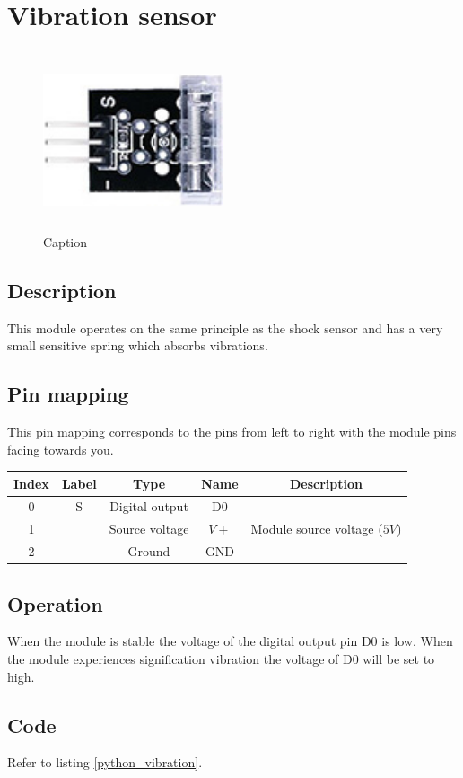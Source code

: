 \section{Vibration sensor}
\begin{figure}[H]
    \centering
    \includegraphics[angle=0, keepaspectratio=true, scale=1, width=200px, height=200px]{images/vibration.jpg}
    \caption{Caption}
\end{figure}
\subsection*{Description}
This module operates on the same principle as the shock sensor and has a very small sensitive spring which absorbs vibrations.
\subsection*{Pin mapping}
This pin mapping corresponds to the pins from left to right with the module pins facing towards you.
\begin{table}[H]
    \centering
    \begin{tabular}{|c|c|c|c|c|}
    \hline
    Index &Label &Type &Name &Description\\ \hline
    0 &S &Digital output &D0 &\\ \hline
    1 & &Source voltage &$V+$ &Module source voltage ($5V$)\\ \hline
    2 &- &Ground &GND &\\ \hline
    \end{tabular}
\end{table}
\subsection*{Operation}
When the module is stable the voltage of the digital output pin D0 is low. When the module experiences signification vibration the voltage of D0 will be set to high.
\subsection*{Code}
Refer to listing \ref{python_vibration}.
%